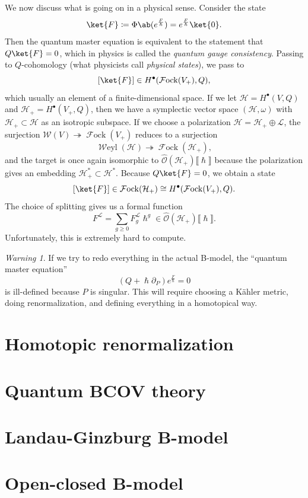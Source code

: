 \documentclass[article,10pt,oneside,oldfontcommands]{memoir}
\theoremstyle{definition}
\theoremstyle{remark}
\newtheorem{warn}[thm]{Warning}
\theoremstyle{plain}
\theoremstyle{definition}
\theoremstyle{remark}
\newcommand{\mc}[1]{\mathcal{#1}}
\newcommand{\on}[1]{\operatorname{#1}}
\newcommand{\1}{\mathbf{1}}
\newcommand{\2}{\mathbf{2}}
\newcommand{\3}{\mathbf{3}}
\newcommand{\ps}[1]{\lBrack #1 \rBrack}
\DeclareMathOperator{\Fock}{\mc{F}ock}
\begin{document}
We now discuss what is going on in a physical sense. Consider the state
\[ \ket{F} \coloneqq \Phi \ab(e^{\frac{F}{\hslash}}) = e^{\frac{F}{\hslash}} \ket{0}. \]
Then the quantum master equation is equivalent to the statement that \(Q \ket{F} = 0\), which in physics is called the \textit{quantum gauge consistency}. Passing to \(Q\)-cohomology (what physicists call \textit{physical states}), we pass to
\[ [\ket{F}] \in H^{\bullet}(\Fock(V_+), Q), \]
which usually an element of a finite-dimensional space. If we let \(\mc{H} = H^{\bullet}(V, Q)\) and \(\mc{H}_+ = H^{\bullet}(V_+, Q)\), then we have a symplectic vector space \((\mc{H}, \omega)\) with \(\mc{H}_+ \subset \mc{H}\) as an isotropic subspace. If we choose a polarization \(\mc{H} = \mc{H}_+ \oplus \mc{L}\), the surjection \(\mc{W}(V) \twoheadrightarrow \Fock(V_+)\) reduces to a surjection
\[ \on{\mc{W}eyl}(\mc{H}) \twoheadrightarrow \Fock(\mc{H}_+), \]
and the target is once again isomorphic to \(\hat{\mc{O}}(\mc{H}_+) \ps{\hslash}\) because the polarization gives an embedding \(\mc{H}_+^*\subset\mc{H}^*\). Because \(Q \ket{F} = 0\), we obtain a state
\[ [\ket{F}] \in \Fock(\mc{H}_+) \cong H^{\bullet}(\Fock(V_+), Q). \]
The choice of splitting gives us a formal function
\[ F^{\mc{L}} = \sum_{g \geq 0} F_g^{\mc{L}} \hslash^g \in \hat{\mc{O}}(\mc{H}_+) \ps{\hslash}. \]
Unfortunately, this is extremely hard to compute.

\begin{warn}
    If we try to redo everything in the actual B-model, the ``quantum master equation''
    \[ (Q + \hslash \partial_P) e^{\frac{F}{\hslash}} = 0 \]
    is ill-defined because \(P\) is singular. This will require choosing a K\"ahler metric, doing renormalization, and defining everything in a homotopical way.
\end{warn}




\chapter{Homotopic renormalization}%
\label{cha:Homotopic renormalization}

\chapter{Quantum BCOV theory}%
\label{cha:Quantum BCOV theory}

\chapter{Landau-Ginzburg B-model}%
\label{cha:Landau-Ginzburg B-model}

\chapter{Open-closed B-model}%
\label{cha:Open-closed B-model}
\end{document}
